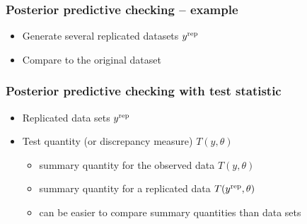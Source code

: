 \documentclass[10pt,handout]{beamer}
\begin{document}
\begin{frame}[fragile]

\frametitle{Posterior predictive checking -- example}

  \begin{itemize}
  \item<1-> Generate several replicated datasets $y^{\rm rep}$
  \item<2-> Compare to the original dataset
  \end{itemize}
  \vspace{-1\baselineskip}

\end{frame}


\begin{frame}

\frametitle{Posterior predictive checking with test statistic}

  \begin{itemize}
  \item Replicated data sets $y^{\operatorname{\mathrm{rep}}}$
  \item Test quantity (or discrepancy measure) $T(y,\theta)$
    \begin{itemize}
    \item summary quantity for the observed data $T(y,\theta)$
    \item summary quantity for a replicated data $T(y^{\operatorname{\mathrm{rep}}},\theta)$
    \item can be easier to compare summary quantities than data sets
    \end{itemize}
  \end{itemize}

\end{frame}
\end{document}
